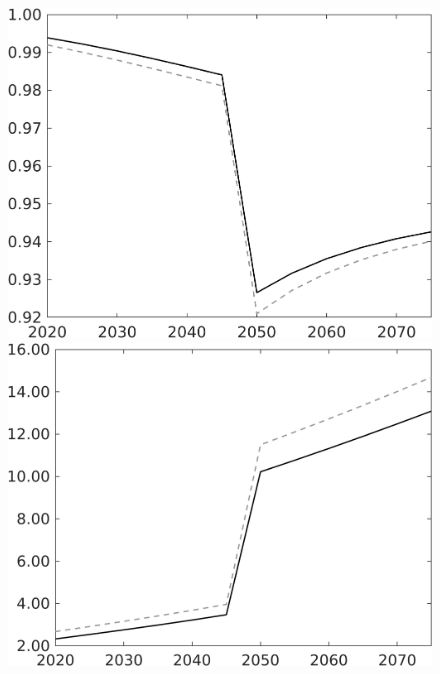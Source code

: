 \begin{figure}[h!!]
\begin{minipage}[]{0.32\textwidth}
\end{minipage}			
\begin{minipage}[]{0.32\textwidth}
	\includegraphics[width=1\textwidth]{../../codding_model/own_basedOnFried/optimalPol_010922_revision/figures/all_13Sept22/CompTauf_bytaul_Reg0_snS_spillover0_nsk0_xgr0_knspil0_sep0_LFlimit1_emsbase0_countec0_GovRev0_etaa0.79_lgd0.png}
\end{minipage}	
\begin{minipage}[]{0.32\textwidth}
\includegraphics[width=1\textwidth]{../../codding_model/own_basedOnFried/optimalPol_010922_revision/figures/all_13Sept22/CompTauf_bytaul_Reg0_GFF_spillover0_nsk0_xgr0_knspil0_sep0_LFlimit1_emsbase0_countec0_GovRev0_etaa0.79_lgd0.png}

\end{minipage}
\end{figure}
